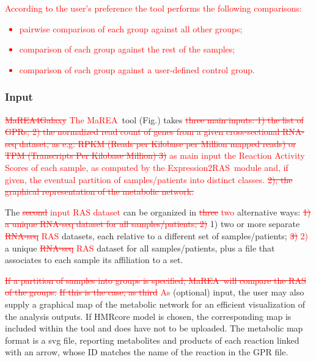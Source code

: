 \documentclass[preprint,12pt,authoryear]{elsarticle}
\newcommand{\red}{\textcolor{red}}
\newcommand{\mareagalaxy}{\textsf{MaREA4Galaxy}}
\newcommand{\mareaTool}{\textsf{MaREA}}
\newcommand{\RASTool}{\textsf{Expression2RAS}}
\begin{document}
\red{According to the user's preference the tool performs the
  following comparisons:
  \begin{itemize}
  \item pairwise comparison of each group against all other groups;
  \item comparison of each group against the rest of the samples;
  \item comparison of each group against a user-defined control group.
  \end{itemize}}


\subsubsection{Input}

\red{\sout{\mareagalaxy} The \mareaTool~}tool
(Fig.\label{fig:screenshot3}) takes \red{\sout{three main inputs: 1)
    the list of GPRs; 2) the normalized read count of genes from a
    given cross-sectional RNA-seq dataset, as e.g. RPKM (Reads per
    Kilobase per Million mapped reads) or TPM (Transcripts Per
    Kilobase Million) 3)} as main input the Reaction Activity Scores
  of each sample, as computed by the \RASTool\ module and\red{, if
    given,} the eventual partition of samples/patients into distinct
  classes. \sout{2); the graphical representation of the metabolic
    network.}}
 

The \red{\sout{second} input RAS dataset} can be organized in
\red{\sout{three} two} alternative ways: \red{\sout{1) a unique
    RNA-seq  dataset for all samples/patients; 2)}} 1) two or more
separate \red{\sout{RNA-seq} RAS} datasets, each relative to a
different set of samples/patients; \red{\sout{3)} 2)} a unique
\red{\sout{RNA-seq} RAS} dataset for all samples/patients, plus a file
that associates to each sample its affiliation to a set.


\red{\sout{If a partition of samples into groups is specified,
    \mareaTool\ will compare the RAS of the groups.}} \red{\sout{If
    this is the case, as third} As} (optional) input, the user may
also supply a graphical map of the metabolic network for an efficient
visualization of the analysis outputs. If HMRcore model is chosen, the
corresponding map is included within the tool and does have not to be
uploaded. The metabolic map format is a svg file, reporting
metabolites and products of each reaction linked with an arrow, whose
ID matches the name of the reaction in the GPR file.
\end{document}
